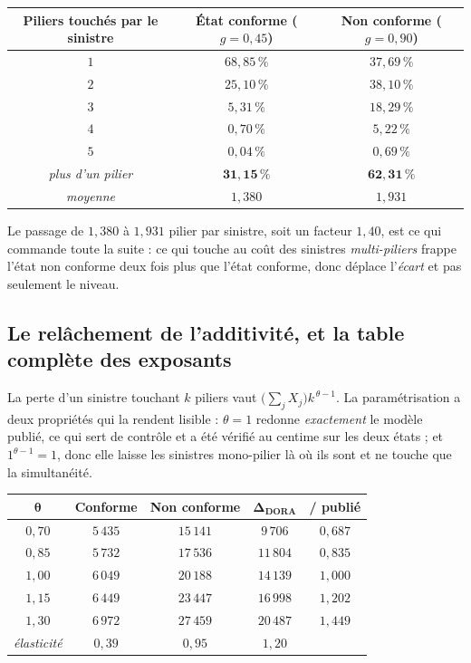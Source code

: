 \begin{center}\footnotesize
\renewcommand{\arraystretch}{1.25}
\begin{tabular}{@{}c c c@{}}
\toprule
\textbf{Piliers touchés par le sinistre} & \textbf{État conforme} ($g=0{,}45$) &
\textbf{Non conforme} ($g=0{,}90$) \\
\midrule
$1$ & $68{,}85\,\%$ & $37{,}69\,\%$ \\
$2$ & $25{,}10\,\%$ & $38{,}10\,\%$ \\
$3$ & $5{,}31\,\%$ & $18{,}29\,\%$ \\
$4$ & $0{,}70\,\%$ & $5{,}22\,\%$ \\
$5$ & $0{,}04\,\%$ & $0{,}69\,\%$ \\
\midrule
\emph{plus d'un pilier} & $\mathbf{31{,}15\,\%}$ & $\mathbf{62{,}31\,\%}$ \\
\emph{moyenne} & $1{,}380$ & $1{,}931$ \\
\bottomrule
\end{tabular}
\end{center}

\vspace{4pt}
\noindent Le passage de $1{,}380$ à $1{,}931$ pilier par sinistre, soit un facteur $1{,}40$, est ce
qui commande toute la suite : ce qui touche au coût des sinistres \emph{multi-piliers} frappe l'état
non conforme deux fois plus que l'état conforme, donc déplace l'\emph{écart} et pas seulement le
niveau.

\subsection*{Le relâchement de l'additivité, et la table complète des exposants}

La perte d'un sinistre touchant $k$ piliers vaut $\bigl(\sum_j X_j\bigr)k^{\,\theta-1}$. La
paramétrisation a deux propriétés qui la rendent lisible : $\theta=1$ redonne \emph{exactement} le
modèle publié, ce qui sert de contrôle et a été vérifié au centime sur les deux états ; et
$1^{\theta-1}=1$, donc elle laisse les sinistres mono-pilier là où ils sont et ne touche que la
simultanéité.

\begin{center}\footnotesize
\renewcommand{\arraystretch}{1.25}
\begin{tabular}{@{}c c c c c@{}}
\toprule
$\boldsymbol{\theta}$ & \textbf{Conforme} & \textbf{Non conforme} &
$\boldsymbol{\Delta_{\text{DORA}}}$ & \textbf{/ publié} \\
\midrule
$0{,}70$ & $5\,435$ & $15\,141$ & $9\,706$ & $0{,}687$ \\
$0{,}85$ & $5\,732$ & $17\,536$ & $11\,804$ & $0{,}835$ \\
$1{,}00$ & $6\,049$ & $20\,188$ & $14\,139$ & $1{,}000$ \\
$1{,}15$ & $6\,449$ & $23\,447$ & $16\,998$ & $1{,}202$ \\
$1{,}30$ & $6\,972$ & $27\,459$ & $20\,487$ & $1{,}449$ \\
\midrule
\emph{élasticité} & $0{,}39$ & $0{,}95$ & $1{,}20$ & \\
\bottomrule
\end{tabular}
\end{center}

